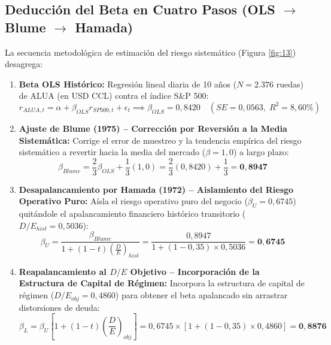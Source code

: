 \documentclass[11pt,a4paper]{article}
\begin{document}
\subsection{Deducción del Beta en Cuatro Pasos (OLS \texorpdfstring{$\to$}{->} Blume \texorpdfstring{$\to$}{->} Hamada)}
La secuencia metodológica de estimación del riesgo sistemático (Figura \ref{fig:13}) desagrega:
\begin{enumerate}
    \item \textbf{Beta OLS Histórico:} Regresión lineal diaria de 10 años ($N=2.376$ ruedas) de ALUA (en USD CCL) contra el índice S\&P 500:
    \begin{equation}
        r_{ALUA, t} = \alpha + \beta_{OLS} r_{SP500, t} + \epsilon_t \implies \beta_{OLS} = 0,8420 \quad (SE = 0,0563, \; R^2 = 8,60\%)
    \end{equation}
    \item \textbf{Ajuste de Blume (1975) -- Corrección por Reversión a la Media Sistemática:} Corrige el error de muestreo y la tendencia empírica del riesgo sistemático a revertir hacia la media del mercado ($\beta = 1,0$) a largo plazo:
    \begin{equation}
        \beta_{Blume} = \frac{2}{3} \beta_{OLS} + \frac{1}{3} (1,0) = \frac{2}{3} (0,8420) + \frac{1}{3} = \mathbf{0,8947}
    \end{equation}
    \item \textbf{Desapalancamiento por Hamada (1972) -- Aislamiento del Riesgo Operativo Puro:} Aísla el riesgo operativo puro del negocio ($\beta_U = 0,6745$) quitándole el apalancamiento financiero histórico transitorio ($D/E_{hist} = 0,5036$):
    \begin{equation}
        \beta_U = \frac{\beta_{Blume}}{1 + (1 - t) \left(\frac{D}{E}\right)_{hist}} = \frac{0,8947}{1 + (1 - 0,35) \times 0,5036} = \mathbf{0,6745}
    \end{equation}
    \item \textbf{Reapalancamiento al $D/E$ Objetivo -- Incorporación de la Estructura de Capital de Régimen:} Incorpora la estructura de capital de régimen ($D/E_{obj} = 0,4860$) para obtener el beta apalancado sin arrastrar distorsiones de deuda:
    \begin{equation}
        \beta_L = \beta_U \left[ 1 + (1 - t) \left(\frac{D}{E}\right)_{obj} \right] = 0,6745 \times [1 + (1 - 0,35) \times 0,4860] = \mathbf{0,8876}
    \end{equation}
\end{enumerate}
\end{document}
